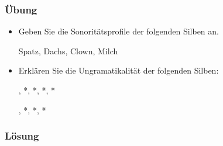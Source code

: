{
\begin{frame}
\frametitle{Übung}

\begin{itemize}
	\item Geben Sie die Sonoritätsprofile der folgenden Silben an.
	
	\ea Spatz, Dachs, Clown, Milch
	\z
	
	
	
	\item Erklären Sie die Ungramatikalität der folgenden Silben:
	
	\ea *\textipa{[lbat]}, *\textipa{[blabl]}, *, *\textipa{[ki:l\textscr]}, *\textipa{[ngang]}
	\z
	
	
	\ea *\textipa{[krafm]}, *\textipa{[elat]}, *\textipa{[plaml]}, *\textipa{[nfatl]}
	\z 
	
\end{itemize}

\end{frame}


\begin{frame}
\frametitle{Lösung}


\end{frame}}
